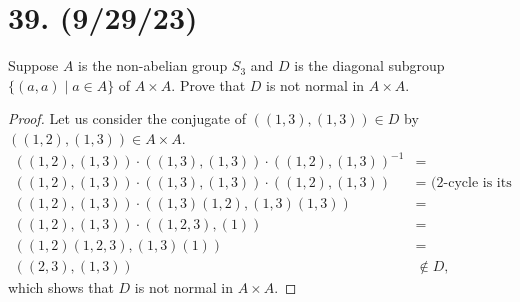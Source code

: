 \documentclass{article}
\begin{document}
\section*{39. (9/29/23)}

Suppose $A$ is the non-abelian group $S_3$ and $D$ is the diagonal subgroup $\{ (a, a) \mid a \in A \}$ of $A \times A$. Prove that $D$ is not normal in $A \times A$.

\begin{proof}
    Let us consider the conjugate of $((1, 3), (1, 3)) \in D$ by $((1, 2), (1, 3)) \in A \times A$.
    \begin{align*}
        ((1, 2), (1, 3)) \cdot ((1, 3), (1, 3)) \cdot ((1, 2), (1, 3))^{-1} &= \\
        ((1, 2), (1, 3)) \cdot ((1, 3), (1, 3)) \cdot ((1, 2), (1, 3)) &= \text{ (2-cycle is its own inverse)} \\
        ((1, 2), (1, 3)) \cdot ((1, 3)(1, 2), (1, 3)(1, 3)) &= \\
        ((1, 2), (1, 3)) \cdot ((1, 2, 3), (1)) &= \\
        ((1, 2)(1, 2, 3), (1, 3)(1)) &= \\
        ((2, 3), (1, 3)) &\notin D,
    \end{align*}
    which shows that $D$ is not normal in $A \times A$.
\end{proof}
\end{document}
